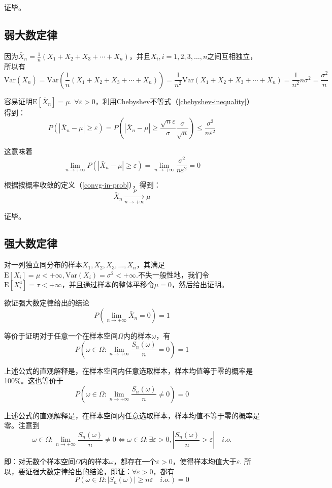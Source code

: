 \documentclass[UTF8]{ctexbook}
\begin{document}
证毕。

\subsection{弱大数定律}
\label{WLLN-proof}
因为$\bar{X}_n=\frac{1}{n}(X_1+X_2+X_3+\cdots+X_n)$，并且$X_i,i=1,2,3,\dots,n$之间互相独立，所以有
\[
	\mathrm{Var}(\bar{X}_n)=\mathrm{Var}(\frac{1}{n}(X_1+X_2+X_3+\cdots+X_n))=\frac{1}{n^2}\mathrm{Var}(X_1+X_2+X_3+\cdots+X_n)=\frac{1}{n^2}n\sigma^2=\frac{\sigma^2}{n}
\]

容易证明$\mathrm E[\bar{X}_n]=\mu$. $\forall\varepsilon>0$，利用Chebyshev不等式（\ref{chebyshev-inequality}）得到：
\[
	P(|\bar{X}_n-\mu|\geq\varepsilon)=P(|\bar{X}_n-\mu|\geq\frac{\sqrt{n}\varepsilon}{\sigma}\frac{\sigma}{\sqrt{n}})\leq\frac{\sigma^2}{n\varepsilon^2}
\]

这意味着
\[
	\lim_{n\to+\infty}P(|\bar{X}_n-\mu|\geq\varepsilon)=\lim_{n\to+\infty}\frac{\sigma^2}{n\varepsilon^2}=0
\]

根据按概率收敛的定义（\ref{convg-in-prob}），得到：
\[
	\bar{X}_n\xrightarrow[n\to+\infty]{P}\mu
\]

证毕。
\subsection{强大数定律}
\label{SLLN-proof}
对一列独立同分布的样本$X_1,X_2,X_3,\dots,X_n$，其满足$\mathrm E[X_i]=\mu<+\infty,\mathrm{Var}(X_i)=\sigma^2<+\infty$.不失一般性地，我们令$\mathrm E[X_i^4]=\tau<+\infty$，并且通过样本的整体平移令$\mu=0$，然后给出证明。

欲证强大数定律给出的结论
\[
	P\left(\lim_{n\to+\infty}\bar{X}_n=0\right)=1
\]

等价于证明对于任意一个在样本空间$\Omega$内的样本$\omega$，有
\[
	P\left(\omega\in\Omega:\lim_{n\to+\infty}\frac{S_n(\omega)}{n}=0\right)=1
\]

上述公式的直观解释是，在样本空间内任意选取样本，样本均值等于零的概率是100\%。这也等价于
\[
	P\left(\omega\in\Omega:\lim_{n\to+\infty}\frac{S_n(\omega)}{n}\neq0\right)=0
\]

上述公式的直观解释是，在样本空间内任意选取样本，样本均值不等于零的概率是零。注意到
\[
	\omega\in\Omega:\lim_{n\to+\infty}\frac{S_n(\omega)}{n}\neq0\Longleftrightarrow\omega\in\Omega:\exists\varepsilon>0,\left|\frac{S_n(\omega)}{n}>\varepsilon\right|\quad i.o.
\]

即：对无数个样本空间$\Omega$内的样本$\omega$，都存在一个$\varepsilon>0$，使得样本均值大于$\varepsilon$. 所以，要证强大数定律给出的结论，即证：$\forall\varepsilon>0$，都有
\[
	P\left(\omega\in\Omega:|S_n(\omega)|\geq n\varepsilon\quad i.o.\right)=0
\]
\end{document}
